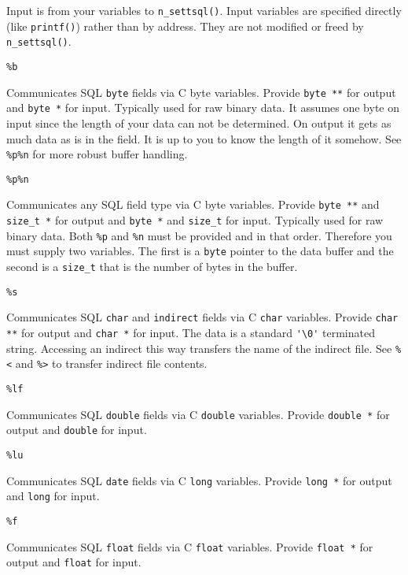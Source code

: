 Input is from your variables to \verb`n_settsql()`. Input variables
are specified directly (like \verb`printf()`) rather than by address.
They are not modified or freed by \verb`n_settsql()`.

\begin{verbatim}
%b
\end{verbatim}
Communicates SQL {\tt byte} fields via C byte variables.  Provide
\verb`byte **` for output and \verb`byte *` for input.  Typically used
for raw binary data.  It assumes one byte on input since the length of
your data can not be determined.  On output it gets as much data as is
in the field.  It is up to you to know the length of it somehow.  See
\verb|%p%n| for more robust buffer handling.

\begin{verbatim}
%p%n
\end{verbatim}
Communicates any SQL field type via C byte variables.  Provide
\verb`byte **` and \verb`size_t *` for output and \verb`byte *` and
\verb`size_t` for input.  Typically used for raw binary data.  Both
\verb`%p` and \verb`%n` must be provided and in that order.  Therefore
you must supply two variables.  The first is a \verb`byte` pointer to
the data buffer and the second is a \verb`size_t` that is the number of
bytes in the buffer.


\begin{verbatim}
%s
\end{verbatim}
Communicates SQL {\tt char} and {\tt indirect} fields via C {\tt char} variables.  Provide
\verb`char **` for output and \verb`char *` for input.  The data is a
standard \verb`'\0'` terminated string.  Accessing an indirect this way
transfers the name of the indirect file.  See \verb`%<` and \verb`%>` to
transfer indirect file contents.

\begin{verbatim}
%lf
\end{verbatim}
Communicates SQL {\tt double} fields via C {\tt double} variables. Provide
\verb`double *` for output and \verb`double` for input.

\begin{verbatim}
%lu
\end{verbatim}
Communicates SQL {\tt date} fields via C {\tt long} variables. Provide
\verb`long *` for output and \verb`long` for input.

\begin{verbatim}
%f
\end{verbatim}
Communicates SQL {\tt float} fields via C {\tt float} variables. Provide
\verb`float *` for output and \verb`float` for input.


